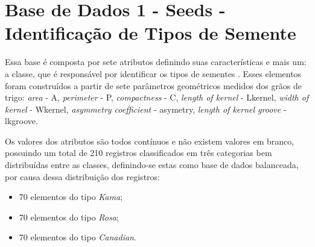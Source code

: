 




\section{Base de Dados 1 - Seeds - Identificação de Tipos de Semente}
Essa base é composta por sete  atributos definindo suas características e mais um: a  classe, que é responsável por identificar os tipos de sementes \cite{Charytanowicz2010}. Esses elementos foram construídos a partir de sete parâmetros geométricos medidos dos grãos de trigo: \textit{area} - A, \textit{perimeter} - P, \textit{compactness} - C, \textit{length of kernel} - Lkernel, \textit{width of kernel} - Wkernel, \textit{asymmetry coefficient} - asymetry, \textit{length of kernel groove} - lkgroove.


Os valores dos atributos são todos contínuos e não existem valores em branco, possuindo um total de 210 registros classificados em três categorias bem distribuídas entre as classes, definindo-se estas como base de dados balanceada, por causa dessa distribuição dos registros:

\begin{itemize}[noitemsep]
 \item 70 elementos do tipo \textit{Kama};
 \item 70 elementos do tipo \textit{Rosa};
 \item 70 elementos do tipo \textit{Canadian}.
\end{itemize}


